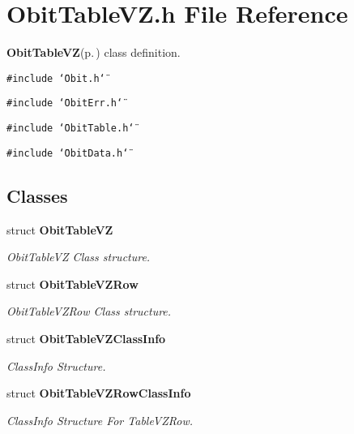 \section{Obit\-Table\-VZ.h File Reference}
\label{ObitTableVZ_8h}
{\bf Obit\-Table\-VZ}{\rm (p.\,\pageref{structObitTableVZ})} class definition. 

{\tt \#include \char`\"{}Obit.h\char`\"{}}\par
{\tt \#include \char`\"{}Obit\-Err.h\char`\"{}}\par
{\tt \#include \char`\"{}Obit\-Table.h\char`\"{}}\par
{\tt \#include \char`\"{}Obit\-Data.h\char`\"{}}\par
\subsection*{Classes}
\begin{CompactItemize}
\item 
struct {\bf Obit\-Table\-VZ}
\begin{CompactList}\small\item\em Obit\-Table\-VZ Class structure. \item\end{CompactList}\item 
struct {\bf Obit\-Table\-VZRow}
\begin{CompactList}\small\item\em Obit\-Table\-VZRow Class structure. \item\end{CompactList}\item 
struct {\bf Obit\-Table\-VZClass\-Info}
\begin{CompactList}\small\item\em Class\-Info Structure. \item\end{CompactList}\item 
struct {\bf Obit\-Table\-VZRow\-Class\-Info}
\begin{CompactList}\small\item\em Class\-Info Structure For Table\-VZRow. \item\end{CompactList}\end{CompactItemize}

